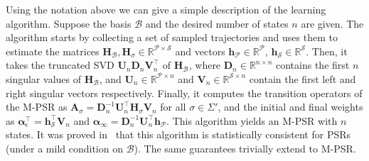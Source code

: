 \documentclass[letterpaper]{article}
\newcommand{\mat}[1]{\mathbf{#1}}
\newcommand{\A}{\mat{A}}
\renewcommand{\H}{\mat{H}}
\newcommand{\Rset}{\mathbb{R}}
\newcommand{\R}{\Rset}
\newcommand{\aone}{\boldsymbol{\alpha}_\epsilon}
\newcommand{\ainf}{\boldsymbol{\alpha}_{\infty}}
\newcommand{\Bs}{\mathcal{B}}
\newcommand{\Ps}{\mathcal{P}}
\newcommand{\Ss}{\mathcal{S}}
\begin{document}
Using the notation above we can give a simple description of the learning algorithm. Suppose the basis $\Bs$ and the desired number of states $n$ are given. The algorithm starts by collecting a set of sampled trajectories and uses them to estimate the matrices $\H_{\Bs}, \H_\sigma \in \R^{\Ps \times \Ss}$ and vectors $\mat{h}_{\Ps} \in \R^{\Ps}$, $\mat{h}_{\Ss} \in \R^{\Ss}$. Then, it takes the truncated SVD $\mat{U}_n \mat{D}_n \mat{V}_n^\top$ of $\H_{\Bs}$, where $\mat{D}_n \in \R^{n \times n}$ contains the first $n$ singular values of $\H_{\Bs}$, and $\mat{U}_n \in \R^{\Ps \times n}$ and $\mat{V}_n \in \R^{\Ss \times n}$ contain the first left and right singular vectors respectively. Finally, it computes the transition operators of the M-PSR as $\A_\sigma = \mat{D}_n^{-1} \mat{U}_n^\top \H_\sigma \mat{V}_n$ for all $\sigma \in \Sigma'$, and the initial and final weights as $\aone^\top = \mat{h}_{\Ss}^\top \mat{V}_n$ and $\ainf = \mat{D}_n^{-1} \mat{U}_n^\top \mat{h}_{\Ps}$.
%
This algorithm yields an M-PSR with $n$ states. It was proved in~\cite{bootspsr} that this algorithm is statistically consistent for PSRs (under a mild condition on $\Bs$). The same guarantees trivially extend to M-PSR.
\end{document}
